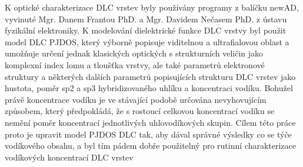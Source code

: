K optické charakterizace DLC vrstev byly používány programy z balíčku newAD, vyvinuté Mgr. Danem Frantou PhD. a Mgr. Davidem Nečasem PhD. z ústavu fyzikální elektroniky. K modelování dielektrické funkce DLC vrstvy byl použit model DLC PJDOS, který výborně popisuje viditelnou a ultrafialovou oblast a umožňuje určení jednak klasic\-kých optických s strukturních veličin jako komplexní index lomu a tloušťka vrstvy, ale také parametrů elektronové struktury a některých dalších parametrů popisujících strukturu DLC vrstev jako hustota, poměr sp2 a sp3 hybridizovaného uhlíku a koncentraci vodíku. 
Bohužel právě koncentrace vodíku je ve stávající podobě určována nevyhovujícím způsobem, který předpokládá, že s rostoucí celkovou koncentrací vodíku se nemění poměr koncentrací jednotlivých uhlovodíkových skupin. Cílem této práce proto je upravit model PJDOS DLC tak, aby dával správné výsledky co se týče vodíkového obsahu, a byl tím pádem dobře použitelný pro rutinní charakterizace vodíkových koncentrací DLC vrstev
 
\cleardoublepage

